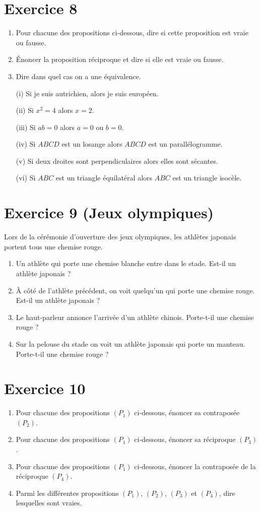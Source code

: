 \documentclass[12pt,a4paper]{article}
\begin{document}
\section*{Exercice 8}
\begin{enumerate}
\item Pour chacune des propositions ci-dessous, dire si cette proposition est vraie ou fausse.
\item Énoncer la proposition réciproque et dire si elle est vraie ou fausse.
\item Dire dans quel cas on a une équivalence.
\end{enumerate}

\begin{enumerate}
\item[(i)] Si je suis autrichien, alors je suis européen.
\item[(ii)] Si $x^2=4$ alors $x=2$.
\item[(iii)] Si $ab=0$ alors $a=0$ ou $b=0$.
\item[(iv)] Si $ABCD$ est un losange alors $ABCD$ est un parallélogramme.
\item[(v)] Si deux droites sont perpendiculaires alors elles sont sécantes.
\item[(vi)] Si $ABC$ est un triangle équilatéral alors $ABC$ est un triangle isocèle.
\end{enumerate}

\section*{Exercice 9 (Jeux olympiques)}
Lors de la cérémonie d’ouverture des jeux olympiques, les athlètes japonais portent tous une chemise rouge.
\begin{enumerate}
\item Un athlète qui porte une chemise blanche entre dans le stade. Est-il un athlète japonais ?
\item À côté de l’athlète précédent, on voit quelqu’un qui porte une chemise rouge. Est-il un athlète japonais ?
\item Le haut-parleur annonce l’arrivée d’un athlète chinois. Porte-t-il une chemise rouge ?
\item Sur la pelouse du stade on voit un athlète japonais qui porte un manteau. Porte-t-il une chemise rouge ?
\end{enumerate}

\section*{Exercice 10}
\begin{enumerate}
\item Pour chacune des propositions $(P_1)$ ci-dessous, énoncer sa contraposée $(P_2)$.
\item Pour chacune des propositions $(P_1)$ ci-dessous, énoncer sa réciproque $(P_3)$.
\item Pour chacune des propositions $(P_1)$ ci-dessous, énoncer la contraposée de la réciproque $(P_4)$.
\item Parmi les différentes propositions $(P_1)$, $(P_2)$, $(P_3)$ et $(P_4)$, dire lesquelles sont vraies.
\end{enumerate}
\end{document}
